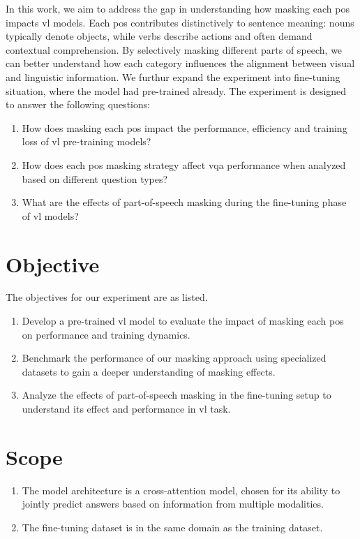 In this work, we aim to address the gap in understanding how masking each \acrfull{pos} impacts \acrshort{vl} models.
Each \acrshort{pos} contributes distinctively to sentence meaning: nouns typically denote objects, while verbs describe actions and often demand contextual comprehension.
By selectively masking different parts of speech, we can better understand how each category influences the alignment between visual and linguistic information.
We furthur expand the experiment into fine-tuning situation, where the model had pre-trained already.
The experiment is designed to answer the following questions:
\begin{enumerate}
    \item How does masking each \acrshort{pos} impact the performance, efficiency and training loss of \acrshort{vl} pre-training models?
    \item How does each \acrshort{pos} masking strategy affect \acrfull{vqa} performance when analyzed based on different question types?
    \item What are the effects of part-of-speech masking during the fine-tuning phase of \acrshort{vl} models?
\end{enumerate}

\section{Objective}
The objectives for our experiment are as listed.
\begin{enumerate}
    \item Develop a pre-trained \acrshort{vl} model to evaluate the impact of masking each \acrshort{pos} on performance and training dynamics.
    \item Benchmark the performance of our masking approach using specialized datasets to gain a deeper understanding of masking effects.
    \item Analyze the effects of part-of-speech masking in the fine-tuning setup to understand its effect and performance in \acrshort{vl} task.
\end{enumerate}

\section{Scope}
\begin{enumerate}
    \item The model architecture is a cross-attention model, chosen for its ability to jointly predict answers based on information from multiple modalities.
    \item The fine-tuning dataset is in the same domain as the training dataset.
\end{enumerate}


